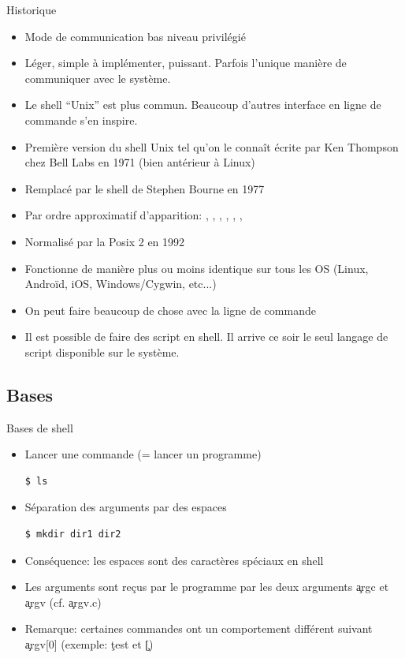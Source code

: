 \begin{frame}[fragile=singleslide]{Historique}
  \begin{itemize}
  \item Mode de communication bas niveau privilégié
  \item  Léger,  simple  à  implémenter, puissant.   Parfois  l'unique
    manière de communiquer avec le système.
  \item Le shell ``Unix'' est plus commun. Beaucoup d'autres interface
    en ligne de commande s'en inspire.
  \item Première version du shell Unix tel qu'on le connaît écrite par
    Ken Thompson chez Bell Labs en 1971 (bien antérieur à Linux)
  \item Remplacé par le shell de Stephen Bourne en 1977
  \item  Par  ordre  approximatif d'apparition:  ,  ,
    , , , , 
  \item Normalisé par la Posix 2 en 1992
  \item Fonctionne de manière plus  ou moins identique sur tous les OS
    (Linux, Androïd, iOS, Windows/Cygwin, etc...)
  \item On peut faire beaucoup de chose avec la ligne de commande
  \item Il  est possible de  faire des script  en shell. Il  arrive ce
    soir le seul langage de script disponible sur le système.
  \end{itemize}
\end{frame}

\subsection{Bases}

\begin{frame}[fragile=singleslide]{Bases de shell}
  \begin{itemize}
  \item Lancer une commande (= lancer un programme)
    \begin{lstlisting}
$ ls
    \end{lstlisting} %
  \item Séparation des arguments par des espaces
    \begin{lstlisting}
$ mkdir dir1 dir2
    \end{lstlisting} %
  \item Conséquence: les espaces sont des caractères spéciaux en shell
  \item  Les  arguments sont  reçus  par  le  programme par  les  deux
    arguments \c{argc} et \c{argv} (cf. \c{argv.c})
  \item  Remarque: certaines commandes  ont un  comportement différent
    suivant \c{argv[0]} (exemple: \c{test} et \c{[})
  \end{itemize}
\end{frame}

